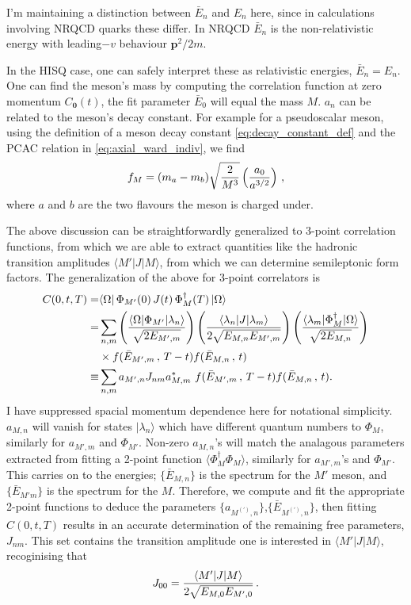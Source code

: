 I'm maintaining a distinction between $\bar{E}_n$ and $E_n$ here, since in calculations involving NRQCD quarks these differ. In NRQCD $\bar{E}_n$ is the non-relativistic energy with leading$-v$ behaviour ${\textbf{p}}^2/2m$.

In the HISQ case, one can safely interpret these as relativistic energies, $\bar{E}_n=E_n$. One can find the meson's mass by computing the correlation function at zero momentum $C_{{\textbf{0}}}(t)$, the fit parameter $\bar{E}_0$ will equal the mass $M$. $a_n$ can be related to the meson's decay constant. For example for a pseudoscalar meson, using the definition of a meson decay constant \eqref{eq:decay_constant_def} and the PCAC relation in \eqref{eq:axial_ward_indiv}, we find
\begin{align}
  f_M = (m_a-m_b) \sqrt{2\over M^3} \left({a_0\over a^{3/2}}\right)\,,
  \label{eq:decayconstant_pseudoscalar}
\end{align}
where $a$ and $b$ are the two flavours the meson is charged under.

The above discussion can be straightforwardly generalized to 3-point correlation functions, from which we are able to extract quantities like the hadronic transition amplitudes $\langle M' | J | M \rangle$, from which we can determine semileptonic form factors. The generalization of the above for 3-point correlators is
\begin{align}
  \nonumber
  C(0,t,T) =& \langle \Omega | \, \Phi_{M'}(0)\, J(t)\, \Phi_{M}^{\dagger}(T)\, | \Omega \rangle
  \\ \nonumber
  =& \sum_{n,m}  \left( {\langle \Omega | \Phi_{M'} | \lambda_n \rangle \over \sqrt{2E_{M',m}}} \right) \left({\langle \lambda_n | J | \lambda_m \rangle \over 2\sqrt{ E_{M,n} E_{M',m} } }\right) \left( {\langle \lambda_m | \Phi_{M}^{\dagger} | \Omega \rangle \over \sqrt{2E_{M,n}} } \right) \\ \nonumber &\times f(\bar{E}_{M',m}\,,\,T-t) f(\bar{E}_{M,n}\,,\,t) \\
  \equiv& \sum_{n,m} a_{M',n} J_{nm} a^*_{M,m} \,\, f(\bar{E}_{M',m}\,,\,T-t) f(\bar{E}_{M,n}\,,\,t).
  \label{eq:3ptfitfunction}
\end{align}
I have suppressed spacial momentum dependence here for notational simplicity. $a_{M,n}$ will vanish for states $|\lambda_n\rangle$ which have different quantum numbers to $\Phi_{M}$, similarly for $a_{M',m}$ and $\Phi_{M'}$. Non-zero $a_{M,n}$'s will match the analagous parameters extracted from fitting a 2-point function $\langle \Phi_{M}^{\dagger} \Phi_{M} \rangle$, similarly for $a_{M',m}$'s and $\Phi_{M'}$. This carries on to the energies; $\{\bar{E}_{M,n}\}$ is the spectrum for the $M'$ meson, and $\{\bar{E}_{M'm}\}$ is the spectrum for the $M$. Therefore, we compute and fit the appropriate 2-point functions to deduce the parameters $\{a_{M^{(')},n}\}$,$\{\bar{E}_{M^{(')},n}\}$, then fitting $C(0,t,T)$ results in an accurate determination of the remaining free parameters, $J_{nm}$. This set contains the transition amplitude one is interested in $\langle M' | J | M \rangle$, recoginising that
\begin{align}
  J_{00} = {\langle M' | J | M \rangle \over 2\sqrt{E_{M,0} E_{M',0} } }\,.
\end{align}

